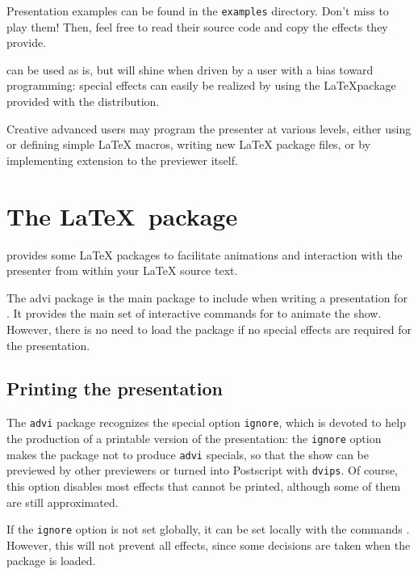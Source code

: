 \documentclass[12pt]{article}
\begin{document}
Presentation examples can be found in the 
\verb"examples" directory. Don't miss to play them! Then, feel free
to read their source code and copy the effects they provide.

{\ActiveDVI} can be used as is, but will shine when driven by a user
with a bias toward programming: special effects can easily 
be realized by using the \LaTeX package provided with the distribution. 

Creative advanced users may program the presenter at various levels, either
using or defining simple {\LaTeX} macros, writing new {\LaTeX} package
files, or by implementing extension to the previewer itself.



\section {The  \LaTeX~package}


{\ActiveDVI} provides some {\LaTeX} packages to facilitate animations and
interaction with the presenter from within your {\LaTeX} source text.

The  advi package is the main package to include when writing
a presentation for {\ActiveDVI}. It provides the main set of interactive
commands for {\ActiveDVI} to animate the show. However, there is no
need to load the package if no {\ActiveDVI} special effects are
required for the presentation.

\subsection{Printing the presentation}

The {\tt advi} package recognizes the special option \verb"ignore",
which is devoted to help the production of a printable version of the
presentation: the \verb"ignore" option makes the package not to
produce {\tt advi} specials, so that the show can be previewed by
other previewers or turned into Postscript with {\tt dvips}. Of
course, this option disables most effects that cannot be printed,
although some of them are still approximated.

If the {\tt ignore} option is not set globally, it can be set
locally with the commands {\docdef \adviignore}. However, this will not
prevent all effects, since some decisions are taken when the package is
loaded.
\end{document}

